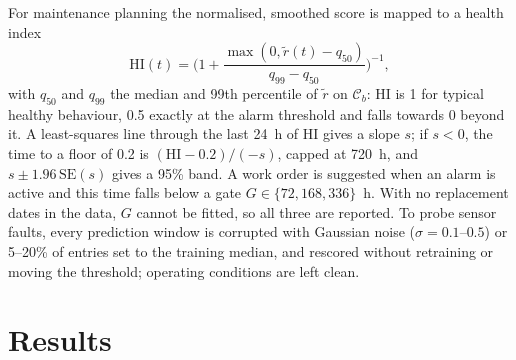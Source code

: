 \documentclass[conference]{IEEEtran}
\begin{document}
For maintenance planning the normalised, smoothed score is mapped to a health index
\begin{equation}
\mathrm{HI}(t)=\Big(1+\frac{\max(0,\tilde r(t)-q_{50})}{q_{99}-q_{50}}\Big)^{-1},
\end{equation}
with $q_{50}$ and $q_{99}$ the median and 99th percentile of $\tilde r$ on $\mathcal{C}_b$: HI is 1 for typical healthy behaviour, 0.5 exactly at the alarm threshold and falls towards 0 beyond it. A least-squares line through the last 24~h of HI gives a slope $s$; if $s<0$, the time to a floor of 0.2 is $(\mathrm{HI}-0.2)/(-s)$, capped at 720~h, and $s\pm1.96\,\mathrm{SE}(s)$ gives a 95\% band. A work order is suggested when an alarm is active and this time falls below a gate $G\in\{72,168,336\}$~h. With no replacement dates in the data, $G$ cannot be fitted, so all three are reported. To probe sensor faults, every prediction window is corrupted with Gaussian noise ($\sigma=0.1$--$0.5$) or 5--20\% of entries set to the training median, and rescored without retraining or moving the threshold; operating conditions are left clean.

\section{Results}
\end{document}
